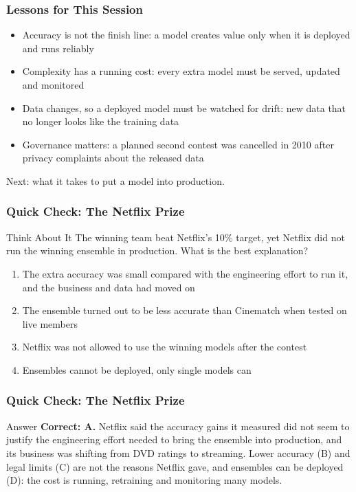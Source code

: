 \begin{frame}[fragile]\frametitle{Lessons for This Session}
\begin{itemize}
\item Accuracy is not the finish line: a model creates value only when it is deployed and runs reliably
\item Complexity has a running cost: every extra model must be served, updated and monitored
\item Data changes, so a deployed model must be watched for drift: new data that no longer looks like the training data
\item Governance matters: a planned second contest was cancelled in 2010 after privacy complaints about the released data
\end{itemize}
Next: what it takes to put a model into production.
\end{frame}

\begin{frame}[fragile]\frametitle{Quick Check: The Netflix Prize}
\begin{block}{Think About It}
The winning team beat Netflix's 10\% target, yet Netflix did not run the winning ensemble in production. What is the best explanation?
\begin{enumerate}
  \item[A.] The extra accuracy was small compared with the engineering effort to run it, and the business and data had moved on
  \item[B.] The ensemble turned out to be less accurate than Cinematch when tested on live members
  \item[C.] Netflix was not allowed to use the winning models after the contest
  \item[D.] Ensembles cannot be deployed, only single models can
\end{enumerate}
\end{block}
\end{frame}

\begin{frame}[fragile]\frametitle{Quick Check: The Netflix Prize}
\begin{block}{Answer}
\textbf{Correct: A.} Netflix said the accuracy gains it measured did not seem to justify the engineering effort needed to bring the ensemble into production, and its business was shifting from DVD ratings to streaming. Lower accuracy (B) and legal limits (C) are not the reasons Netflix gave, and ensembles can be deployed (D): the cost is running, retraining and monitoring many models.
\end{block}
\end{frame}